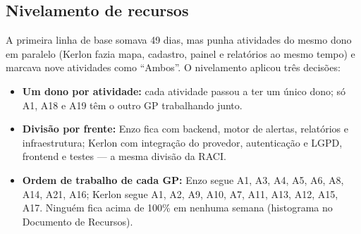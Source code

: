 \documentclass[11pt,a4paper]{article}
\begin{document}
\subsection{Nivelamento de recursos}\label{cro:nivelamento}
A primeira linha de base somava 49 dias, mas punha atividades do mesmo dono em paralelo (Kerlon fazia mapa, cadastro, painel e relatórios ao mesmo tempo) e marcava nove atividades como ``Ambos''. O nivelamento aplicou três decisões:
\begin{itemize}[itemsep=2pt]
  \item \textbf{Um dono por atividade:} cada atividade passou a ter um único dono; só A1, A18 e A19 têm o outro GP trabalhando junto.
  \item \textbf{Divisão por frente:} Enzo fica com backend, motor de alertas, relatórios e infraestrutura; Kerlon com integração do provedor, autenticação e LGPD, frontend e testes --- a mesma divisão da RACI.
  \item \textbf{Ordem de trabalho de cada GP:} Enzo segue A1, A3, A4, A5, A6, A8, A14, A21, A16; Kerlon segue A1, A2, A9, A10, A7, A11, A13, A12, A15, A17. Ninguém fica acima de 100\% em nenhuma semana (histograma no Documento de Recursos).
\end{itemize}
\end{document}
